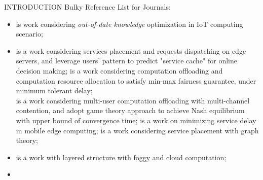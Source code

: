 \documentclass[10pt, conference, letterpaper]{IEEEtran}
\begin{document}
\begin{section}{INTRODUCTION}
        Bulky Reference List for Journals:
        \begin{itemize}
            \item {} \cite{Lyu2017} is work considering \emph{out-of-date knowledge} optimization in IoT computing scenario;
            \item
                \cite{Yang2016} is a work considering services placement and requests dispatching on edge servers, and leverage users' pattern to predict "service cache" for online decision making;
                \cite{Du2018} is a work considering computation offloading and computation resource allocation to satisfy min-max fairness guarantee, under minimum tolerant delay;
                \\
                \cite{Chen2016} is a work considering multi-user computation offloading with multi-channel contention, and adopt game theory approach to achieve Nash equilibrium with upper bound of convergence time;
                \cite{Rodrigues2017} is a work on minimizing service delay in mobile edge computing;
                \cite{Wang2017} is a work considering service placement with graph theory;
            \item \text{[foggy]}
                \cite{Masip-Bruin2016} is a work with layered structure with foggy and cloud computation;
            \item \text{[unfinished]}
        \end{itemize}

    \end{section}
\end{document}
